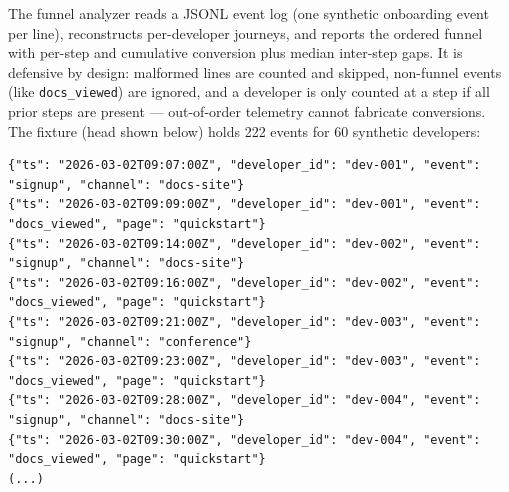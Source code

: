 The funnel analyzer reads a JSONL event log (one synthetic onboarding
event per line), reconstructs per-developer journeys, and reports the
ordered funnel with per-step and cumulative conversion plus median
inter-step gaps. It is defensive by design: malformed lines are counted
and skipped, non-funnel events (like \texttt{docs\_viewed}) are ignored,
and a developer is only counted at a step if all prior steps are present
--- out-of-order telemetry cannot fabricate conversions. The fixture (head
shown below) holds 222 events for 60 synthetic developers:

\begin{verbatim}
{"ts": "2026-03-02T09:07:00Z", "developer_id": "dev-001", "event": "signup", "channel": "docs-site"}
{"ts": "2026-03-02T09:09:00Z", "developer_id": "dev-001", "event": "docs_viewed", "page": "quickstart"}
{"ts": "2026-03-02T09:14:00Z", "developer_id": "dev-002", "event": "signup", "channel": "docs-site"}
{"ts": "2026-03-02T09:16:00Z", "developer_id": "dev-002", "event": "docs_viewed", "page": "quickstart"}
{"ts": "2026-03-02T09:21:00Z", "developer_id": "dev-003", "event": "signup", "channel": "conference"}
{"ts": "2026-03-02T09:23:00Z", "developer_id": "dev-003", "event": "docs_viewed", "page": "quickstart"}
{"ts": "2026-03-02T09:28:00Z", "developer_id": "dev-004", "event": "signup", "channel": "docs-site"}
{"ts": "2026-03-02T09:30:00Z", "developer_id": "dev-004", "event": "docs_viewed", "page": "quickstart"}
(...)
\end{verbatim}

